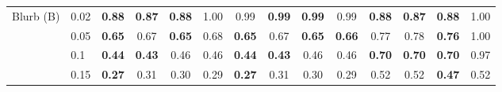 \begin{tabular}{llcccccccccccc}
\midrule
Blurb (B) & 0.02 & \textbf{0.88} & \textbf{0.87} & \textbf{0.88} & 1.00 & 0.99 & \textbf{0.99} & \textbf{0.99} & 0.99 & \textbf{0.88} & \textbf{0.87} & \textbf{0.88} & 1.00 \\
 & 0.05 & \textbf{0.65} & 0.67 & \textbf{0.65} & 0.68 & \textbf{0.65} & 0.67 & \textbf{0.65} & \textbf{0.66} & 0.77 & 0.78 & \textbf{0.76} & 1.00 \\
 & 0.1 & \textbf{0.44} & \textbf{0.43} & 0.46 & 0.46 & \textbf{0.44} & \textbf{0.43} & 0.46 & 0.46 & \textbf{0.70} & \textbf{0.70} & \textbf{0.70} & 0.97 \\
 & 0.15 & \textbf{0.27} & 0.31 & 0.30 & 0.29 & \textbf{0.27} & 0.31 & 0.30 & 0.29 & 0.52 & 0.52 & \textbf{0.47} & 0.52 \\
\bottomrule
\end{tabular}
